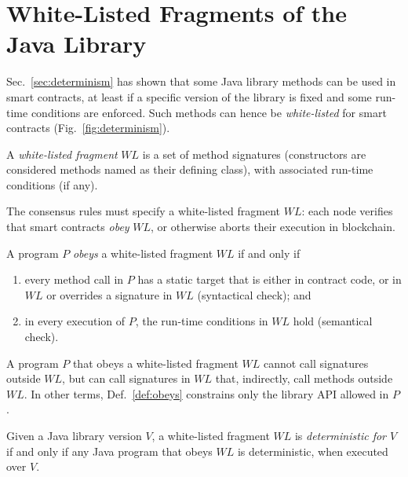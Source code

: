 \section{White-Listed Fragments of the Java Library}\label{sec:white_listing}

\newcommand{\wl}{\mathit{WL}}

Sec.~\ref{sec:determinism} has shown that some Java library methods can be used
in smart contracts, at least if a specific version of the library is fixed and some
run-time conditions are enforced. Such methods can hence be \emph{white-listed} for smart contracts
(Fig.~\ref{fig:determinism}).

\begin{definition}\label{def:white-listing}
  A \emph{white-listed fragment} $\wl$ is a set of method signatures (constructors are considered
  methods named as their defining class), with associated run-time conditions (if any).
\end{definition}
%
The consensus rules must specify a white-listed fragment $\wl$:
each node verifies that smart contracts \emph{obey} $\wl$,
or otherwise aborts their execution in blockchain.
%
\begin{definition}\label{def:obeys}
  A program $P$ \emph{obeys} a white-listed fragment $\wl$ if and only if
  \begin{enumerate}
    \item every method call
      in $P$ has a static target that is either in contract code, or
      in $\wl$ or overrides a signature in $\wl$
      (syntactical check); and
    \item in every execution of $P$, the run-time conditions in $\wl$ hold (semantical check).
  \end{enumerate}
\end{definition}
%
A program $P$ that obeys a white-listed fragment $\wl$ cannot call signatures outside
$\wl$, but can call signatures in $\wl$ that, indirectly, call methods outside $\wl$.
In other terms, Def.~\ref{def:obeys} constrains only the library API allowed in $P$.
%
\begin{definition}\label{def:deterministic}
  Given a Java library version $V$, a white-listed fragment $\wl$ is
  \emph{deterministic for $V$}
  if and only if any Java program that obeys $\wl$
  is deterministic, when executed over $V$.
\end{definition}

